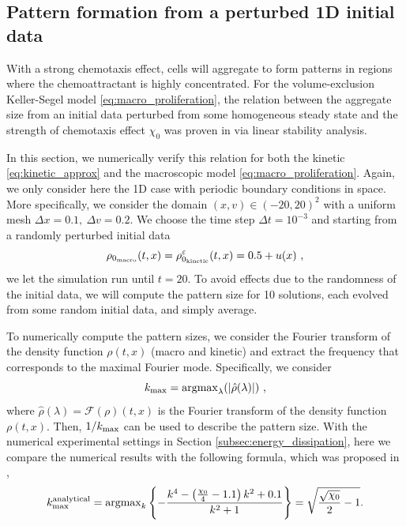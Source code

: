 \documentclass{aims} %
\theoremstyle{definition}
\newcommand {\dx}   {\Delta x}
\begin{document}
{\subsection{Pattern formation from a perturbed 1D initial data}
With a strong chemotaxis effect, cells will aggregate to form patterns in regions where the chemoattractant is highly concentrated. 
For the volume-exclusion Keller-Segel model \eqref{eq:macro_proliferation}, the relation between the aggregate size from { an initial data perturbed from some homogeneous steady state} and the strength of chemotaxis effect $\chi_0$ {was proven in \cite{almeida2020treatment} via linear stability analysis. }
{

}
In this section, we numerically verify this relation for both the kinetic \eqref{eq:kinetic_approx} and the macroscopic model \eqref{eq:macro_proliferation}. 
{Again, we only consider here the 1D case with periodic boundary conditions in space. 
More specifically, we consider the domain $(x,v)\in (-20,20)^2$ with a uniform mesh {$\dx = 0.1,\  \Delta v =  0.2$}. We choose the time step $\Delta t = 10^{-3}$ and starting from a randomly perturbed initial data
\begin{equation*}
    \rho_{0_\textnormal{macro}}(t,x) = \rho_{0_\textnormal{kinetic}}^{\varepsilon}(t,x) = 0.5 + u(x)\ ,
\end{equation*}
we let the simulation run until $t=20$. 
To avoid effects due to the randomness of the initial data, we will compute the pattern size for 10 solutions, each evolved from some random initial data, and simply average. }

To numerically compute the pattern sizes, we consider the Fourier transform of the density function $\rho(t,x)$ (macro and kinetic) and extract the frequency that corresponds to the maximal Fourier mode. 
Specifically, we consider
\begin{equation*}
    k_{\rm max} = \rm{argmax}_{\lambda} (|\hat{\rho}(\lambda)|)\ , 
\end{equation*}
where $\hat{\rho}(\lambda) = \mathcal{F}(\rho)(t,x)$ is the Fourier transform of the density function $\rho(t,x)$. 
Then, $1/k_{\rm max}$ can be used to describe the pattern size. 
{ With the numerical experimental settings in Section \ref{subsec:energy_dissipation}, here we compare the numerical results with the following formula, which was proposed in \cite{almeida2020treatment}, 
\begin{equation*}
k_{\rm max}^{\rm analytical} = {\rm argmax}_{k} \left\{- \frac{k^4 - \left(\frac{\chi_0}{4}-1.1\right)k^2 +0.1}{k^2+1} \right\} = \sqrt{\frac{\sqrt{\chi_0}}{2} - 1}.
\end{equation*}
} 

}
\end{document}
